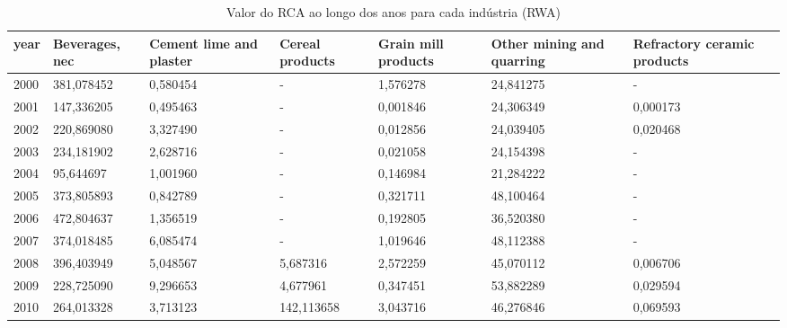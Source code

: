 \begin{table}
\centering
\caption{Valor do RCA ao longo dos anos para cada indústria (RWA)}
\begin{tabular}{p{1cm}p{2cm}p{2cm}p{2cm}p{2cm}p{2cm}p{2cm}}
\toprule
 year &  Beverages, nec &  Cement lime and plaster &  Cereal products &  Grain mill products &  Other mining and quarring &  Refractory ceramic products \\
\midrule
 2000 &      381,078452 &                 0,580454 &                - &             1,576278 &                  24,841275 &                            - \\
 2001 &      147,336205 &                 0,495463 &                - &             0,001846 &                  24,306349 &                     0,000173 \\
 2002 &      220,869080 &                 3,327490 &                - &             0,012856 &                  24,039405 &                     0,020468 \\
 2003 &      234,181902 &                 2,628716 &                - &             0,021058 &                  24,154398 &                            - \\
 2004 &       95,644697 &                 1,001960 &                - &             0,146984 &                  21,284222 &                            - \\
 2005 &      373,805893 &                 0,842789 &                - &             0,321711 &                  48,100464 &                            - \\
 2006 &      472,804637 &                 1,356519 &                - &             0,192805 &                  36,520380 &                            - \\
 2007 &      374,018485 &                 6,085474 &                - &             1,019646 &                  48,112388 &                            - \\
 2008 &      396,403949 &                 5,048567 &         5,687316 &             2,572259 &                  45,070112 &                     0,006706 \\
 2009 &      228,725090 &                 9,296653 &         4,677961 &             0,347451 &                  53,882289 &                     0,029594 \\
 2010 &      264,013328 &                 3,713123 &       142,113658 &             3,043716 &                  46,276846 &                     0,069593 \\

\end{tabular}
\end{table}
